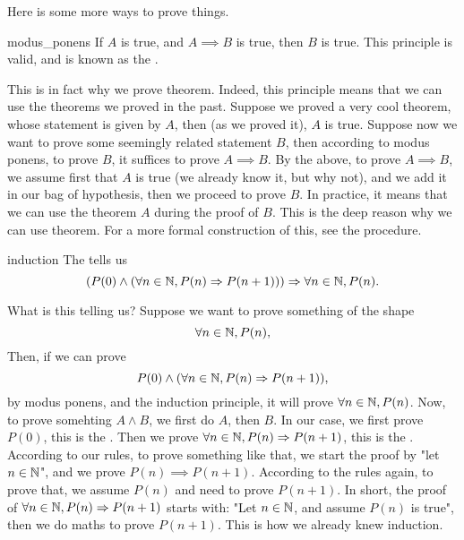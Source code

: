 Here is some more ways to prove things. 
\begin{cdef}{}{modus_ponens}
    If \( A \) is true, and \( A \implies B \) is true, then \( B \) is true. This principle is valid, and is known as the .
\end{cdef} 
This is in fact why we prove theorem. Indeed, this principle means that we can use the theorems we proved in the past. Suppose we proved a very cool theorem, whose statement is given by \( A \), then (as we proved it), \( A \) is true. Suppose now we want to prove some seemingly related statement \( B \), then according to modus ponens, to prove \( B \), it suffices to prove \( A \implies B \). By the above, to prove \( A \implies B \), we assume first that \( A \) is true (we already know it, but why not), and we add it in our bag of hypothesis, then we proceed to prove \( B \). In practice, it means that we can use the theorem \( A \) during the proof of \( B \). This is the deep reason why we can use theorem. For a more formal construction of this, see the  procedure.  

\begin{cdef}{}{induction}
    The  tells us
    \begin{equation*}
        \left(P(0) \land (\forall n \in \mathbb{N}, P(n) \Rightarrow P(n+1)) \right) \Rightarrow \forall n \in \mathbb{N}, P(n).
    \end{equation*} 
\end{cdef}
What is this telling us? Suppose we want to prove something of the shape
\begin{equation*}
    \forall n \in \mathbb{N}, P(n),
\end{equation*}
Then, if we can prove 
\begin{equation*}
    P(0) \land (\forall n \in \mathbb{N}, P(n) \Rightarrow P(n+1)),
\end{equation*}
by modus ponens, and the induction principle, it will prove \( \forall n \in \mathbb{N}, P(n) \). Now, to prove somehting \( A \land B \), we first do \( A \), then \( B \). In our case, we first prove \( P(0) \), this is the . Then we prove \( \forall n \in \mathbb{N}, P(n) \Rightarrow P(n+1) \), this is the . According to our rules, to prove something like that, we start the proof by "let \( n \in \mathbb{N} \)", and we prove \( P(n) \implies P(n+1) \). According to the rules again, to prove that, we assume \( P(n) \) and need to prove \( P(n + 1) \). In short, the proof of \( \forall n \in \mathbb{N}, P(n) \Rightarrow P(n+1) \) starts with:
"Let \( n \in \mathbb{N} \), and assume \( P(n) \) is true", then we do maths to prove \( P(n+1) \). This is how we already knew induction.

